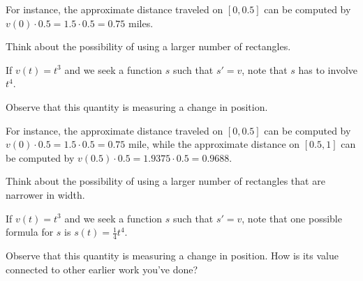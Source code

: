 \begin{smallhint}
\ba
	\item For instance, the approximate distance traveled on $[0,0.5]$ can be computed by $v(0) \cdot 0.5 = 1.5 \cdot 0.5 = 0.75$ miles.
	\item Think about the possibility of using a larger number of rectangles.
	\item If $v(t) = t^3$ and we seek a function $s$ such that $s' = v$, note that $s$ has to involve $t^4$.
	\item Observe that this quantity is measuring a change in position.
\ea
\end{smallhint}
\begin{bighint}
\ba
	\item For instance, the approximate distance traveled on $[0,0.5]$ can be computed by $v(0) \cdot 0.5 = 1.5 \cdot 0.5 = 0.75$ mile, while the approximate distance on $[0.5,1]$ can be computed by $v(0.5) \cdot 0.5 = 1.9375 \cdot 0.5 = 0.9688$.
	\item Think about the possibility of using a larger number of rectangles that are narrower in width.
	\item If $v(t) = t^3$ and we seek a function $s$ such that $s' = v$, note that one possible formula for $s$ is $s(t) = \frac{1}{4}t^4$.
	\item Observe that this quantity is measuring a change in position.  How is its value connected to other earlier work you've done?
\ea
\end{bighint}
